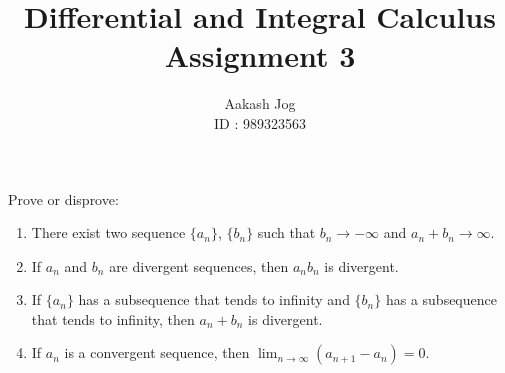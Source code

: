 \documentclass[fleqn, a4paper, 12pt, oneside]{amsart}
\title
{
	Differential and Integral Calculus\\
	Assignment 3
}
\author
{
	Aakash Jog\\
	ID : 989323563
}
\date{\formatdate{16}{4}{2015}}
\theoremstyle{definition}
\theoremstyle{theorem}
\begin{document}
	
\maketitle

\begin{question}
	Prove or disprove:
	\begin{enumerate}[leftmargin=*]
		\item There exist two sequence $\{a_n\}$, $\{b_n\}$ such that $b_n \to -\infty$ and $a_n + b_n \to \infty$.
		\item If $a_n$ and $b_n$ are divergent sequences, then $a_n b_n$ is divergent.
		\item If $\{a_n\}$ has a subsequence that tends to infinity and $\{b_n\}$ has a subsequence that tends to infinity, then
$a_n + b_n$ is divergent.
		\item If $a_n$ is a convergent sequence, then $\lim_{n \to \infty} (a_{n + 1} - a_n) = 0$.
	\end{enumerate}
\end{question}
\end{document}
